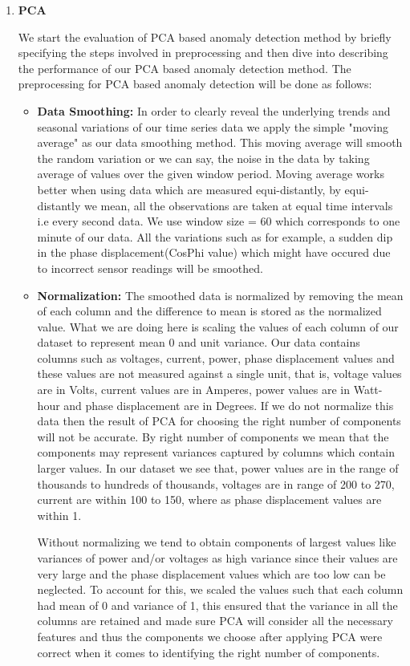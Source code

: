 \begin{enumerate}
\item\textbf{PCA}

We start the evaluation of PCA based anomaly detection method by briefly specifying the steps involved in preprocessing and then dive into describing the performance of our PCA based anomaly detection method. The preprocessing for PCA based anomaly detection will be done as follows:
\begin{itemize}
\item\textbf{Data Smoothing:} In order to clearly reveal the underlying trends and seasonal variations of our time series data we apply the simple "moving average" as our data smoothing method. This moving average will smooth the random variation or we can say, the noise in the data by taking average of values over the given window period. Moving average works better when using data which are measured equi-distantly, by equi-distantly we mean, all the observations are taken at equal time intervals i.e every second data. We use window size = 60 which corresponds to one minute of our data. All the variations such as for example, a sudden dip in the phase displacement(CosPhi value) which might have occured due to incorrect sensor readings will be smoothed.

\item\textbf{Normalization:} The smoothed data is normalized by removing the mean of each column and the difference to mean is stored as the normalized value. What we are doing here is scaling the values of each column of our dataset to represent mean 0 and unit variance. Our data contains columns such as voltages, current, power, phase displacement values and these values are not measured against a single unit, that is, voltage values are in Volts, current values are in Amperes, power values are in Watt-hour and phase displacement are in Degrees. If we do not normalize this data then the result of PCA for choosing the right number of components will not be accurate. By right number of components we mean that the components may represent variances captured by columns which contain larger values. In our dataset we see that, power values are in the range of thousands to hundreds of thousands, voltages are in range of 200 to 270, current are within 100 to 150, where as phase displacement values are within 1. 

Without normalizing we tend to obtain components of largest values like variances of  power and/or voltages  as high variance since their values are very large and the phase displacement values which are too low can be neglected. To account for this, we scaled the values such that each column had mean of 0 and variance of 1, this ensured that the variance in all the columns are retained and made sure PCA will consider all the necessary features and thus the components we choose after applying PCA were correct when it comes to identifying the right number of components.


\end{itemize}
\end{enumerate}
